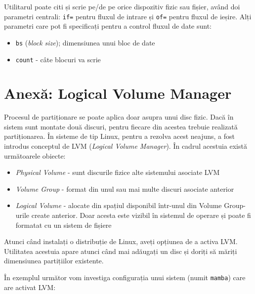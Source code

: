 Utilitarul  poate citi și scrie pe/de pe orice dispozitiv fizic sau fișier, având doi
parametri centrali: \texttt{if=} pentru fluxul de intrare și \texttt{of=} pentru
fluxul de ieșire. Alți parametri care pot fi specificați pentru a control
fluxul de date sunt:

\begin{itemize}
  \item \texttt{bs} (\textit{block size}); dimensiunea unui bloc de date
  \item \texttt{count} - câte blocuri va scrie
\end{itemize}

\section{Anexă: Logical Volume Manager}
\label{sec:storage:lvm}

Procesul de partiționare se poate aplica doar asupra unui disc fizic. Dacă în
sistem sunt montate două discuri, pentru fiecare din acestea trebuie realizată
partiționarea. În sisteme de tip Linux, pentru a rezolva acest neajuns, a fost
introdus conceptul de LVM  (\textit{Logical Volume
Manager}). În cadrul acestuia există următoarele obiecte:

\begin{itemize}
  \item \textit{Physical Volume} - sunt discurile fizice alte sistemului asociate LVM
  \item \textit{Volume Group} - format din unul sau mai multe discuri asociate anterior
  \item \textit{Logical Volume} - alocate din spațiul disponibil într-unul din
    Volume Group-urile create anterior. Doar acesta este vizibil în
    sistemul de operare și poate fi formatat cu un sistem de
    fișiere
\end{itemize}

Atunci când instalați o distribuție de Linux, aveți opțiunea de a activa LVM.
Utilitatea acestuia apare atunci când mai adăugați un disc și doriți să măriți
dimensiunea partițiilor existente.

În exemplul următor vom investiga configurația unui sistem (numit \texttt{mamba}) care are activat LVM:

